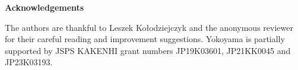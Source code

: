\documentclass{article}
\numberwithin{theorem}{section}
\newtheorem{question}[theorem]{Question}
\newcommand{\ludovic}[1]{\textcolor{blue}{#1}}
\newcommand{\RCA}{\mathsf{RCA}}
\newcommand{\BSig}{\mathsf{B}\Sigma^0}
\newcommand{\WF}{\mathsf{WF}}
\newcommand{\RT}{\mathsf{RT}}
\newcommand{\M}{\mathcal{M}}
\begin{document}


\bigskip
\begin{center}
\textbf{Acknowledgements}
\end{center}
The authors are thankful to Leszek Ko{\l}odziejczyk and the anonymous reviewer for their careful reading and improvement suggestions.
Yokoyama is partially supported by JSPS KAKENHI grant numbers JP19K03601, JP21KK0045 and JP23K03193.



\end{document}
